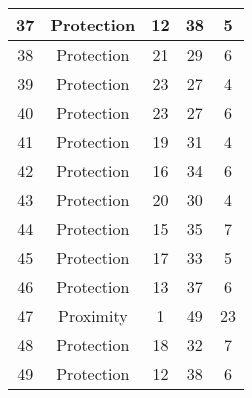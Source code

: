 \documentclass[results.tex]{subfiles}
\begin{document}
\begin{center}
\begin{tabular}{| c || c | c | c | c |}
            \hline
            37                      & Protection                   & 12                     & 38                      & 5                    \\
            \hline
            38                      & Protection                   & 21                     & 29                      & 6                    \\
            \hline
            39                      & Protection                   & 23                     & 27                      & 4                    \\
            \hline
            40                      & Protection                   & 23                     & 27                      & 6                    \\
            \hline
            41                      & Protection                   & 19                     & 31                      & 4                    \\
            \hline
            42                      & Protection                   & 16                     & 34                      & 6                    \\
            \hline
            43                      & Protection                   & 20                     & 30                      & 4                    \\
            \hline
            44                      & Protection                   & 15                     & 35                      & 7                    \\
            \hline
            45                      & Protection                   & 17                     & 33                      & 5                    \\
            \hline
            46                      & Protection                   & 13                     & 37                      & 6                    \\
            \hline
            47                      & Proximity                    & 1                      & 49                      & 23                   \\
            \hline
            48                      & Protection                   & 18                     & 32                      & 7                    \\
            \hline
            49                      & Protection                   & 12                     & 38                      & 6                    \\
            \hline
        \end{tabular}
    \end{center}
\end{document}
